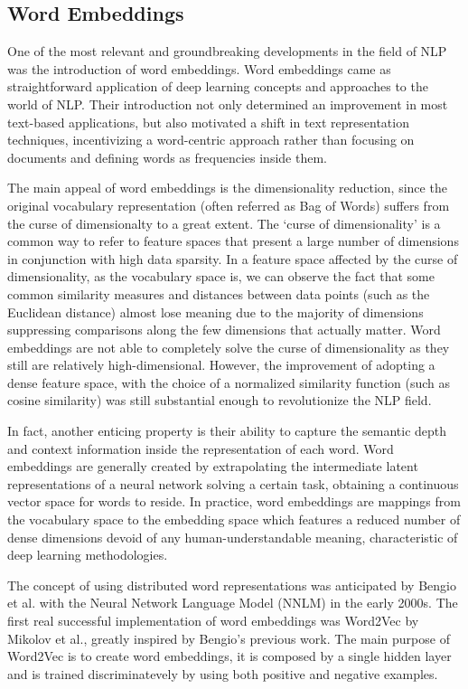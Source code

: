 \subsection{Word Embeddings}

One of the most relevant and groundbreaking developments in the field of NLP was the introduction of word embeddings.
Word embeddings came as straightforward application of deep learning concepts and approaches to the world of NLP.
Their introduction not only determined an improvement in most text-based applications, but also motivated a shift in text representation techniques, incentivizing a word-centric approach rather than focusing on documents and defining words as frequencies inside them.

The main appeal of word embeddings is the dimensionality reduction, since the original vocabulary representation (often referred as Bag of Words) suffers from the curse of dimensionalty to a great extent.
The `curse of dimensionality' is a common way to refer to feature spaces that present a large number of dimensions in conjunction with high data sparsity.
In a feature space affected by the curse of dimensionality, as the vocabulary space is, we can observe the fact that some common similarity measures and distances between data points (such as the Euclidean distance) almost lose meaning due to the majority of dimensions suppressing comparisons along the few dimensions that actually matter.
Word embeddings are not able to completely solve the curse of dimensionality as they still are relatively high-dimensional.
However, the improvement of adopting a dense feature space, with the choice of a normalized similarity function (such as cosine similarity) was still substantial enough to revolutionize the NLP field.

In fact, another enticing property is their ability to capture the semantic depth and context information inside the representation of each word.
Word embeddings are generally created by extrapolating the intermediate latent representations of a neural network solving a certain task, obtaining a continuous vector space for words to reside.
In practice, word embeddings are mappings from the vocabulary space to the embedding space which features a reduced number of dense dimensions devoid of any human-understandable meaning, characteristic of deep learning methodologies.

The concept of using distributed word representations was anticipated by Bengio et al. with the Neural Network Language Model (NNLM) \cite{bengio2020} in the early 2000s.
The first real successful implementation of word embeddings was Word2Vec \cite{mikolov2013} by Mikolov et al., greatly inspired by Bengio's previous work.
The main purpose of Word2Vec is to create word embeddings, it is composed by a single hidden layer and is trained discriminatevely by using both positive and negative examples.

